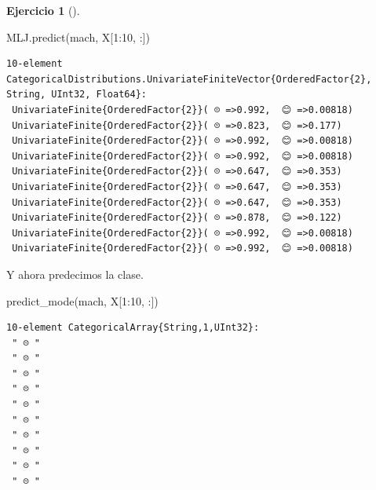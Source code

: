 \documentclass[
  a4paper,
]{scrreport}
\newenvironment{Shaded}{\begin{snugshade}}{\end{snugshade}}
\newcommand{\FloatTok}[1]{\textcolor[rgb]{0.68,0.00,0.00}{#1}}
\newcommand{\FunctionTok}[1]{\textcolor[rgb]{0.28,0.35,0.67}{#1}}
\newcommand{\NormalTok}[1]{\textcolor[rgb]{0.00,0.23,0.31}{#1}}
\newcommand{\OperatorTok}[1]{\textcolor[rgb]{0.37,0.37,0.37}{#1}}
\theoremstyle{definition}
\newtheorem{exercise}{Ejercicio}[chapter]
\theoremstyle{remark}
\begin{document}
\begin{exercise}[]
\begin{enumerate}
\begin{tcolorbox}
\begin{Shaded}
\begin{Highlighting}[]
\NormalTok{MLJ.}\FunctionTok{predict}\NormalTok{(mach, X[}\FloatTok{1}\OperatorTok{:}\FloatTok{10}\NormalTok{, }\OperatorTok{:}\NormalTok{])}
\end{Highlighting}
\end{Shaded}

\begin{verbatim}
10-element CategoricalDistributions.UnivariateFiniteVector{OrderedFactor{2}, String, UInt32, Float64}:
 UnivariateFinite{OrderedFactor{2}}( ☹️ =>0.992,  😊 =>0.00818)
 UnivariateFinite{OrderedFactor{2}}( ☹️ =>0.823,  😊 =>0.177)
 UnivariateFinite{OrderedFactor{2}}( ☹️ =>0.992,  😊 =>0.00818)
 UnivariateFinite{OrderedFactor{2}}( ☹️ =>0.992,  😊 =>0.00818)
 UnivariateFinite{OrderedFactor{2}}( ☹️ =>0.647,  😊 =>0.353)
 UnivariateFinite{OrderedFactor{2}}( ☹️ =>0.647,  😊 =>0.353)
 UnivariateFinite{OrderedFactor{2}}( ☹️ =>0.647,  😊 =>0.353)
 UnivariateFinite{OrderedFactor{2}}( ☹️ =>0.878,  😊 =>0.122)
 UnivariateFinite{OrderedFactor{2}}( ☹️ =>0.992,  😊 =>0.00818)
 UnivariateFinite{OrderedFactor{2}}( ☹️ =>0.992,  😊 =>0.00818)
\end{verbatim}

  Y ahora predecimos la clase.

\begin{Shaded}
\begin{Highlighting}[]
\FunctionTok{predict\_mode}\NormalTok{(mach, X[}\FloatTok{1}\OperatorTok{:}\FloatTok{10}\NormalTok{, }\OperatorTok{:}\NormalTok{])}
\end{Highlighting}
\end{Shaded}

\begin{verbatim}
10-element CategoricalArray{String,1,UInt32}:
 " ☹️ "
 " ☹️ "
 " ☹️ "
 " ☹️ "
 " ☹️ "
 " ☹️ "
 " ☹️ "
 " ☹️ "
 " ☹️ "
 " ☹️ "
\end{verbatim}

  \end{tcolorbox}
\end{enumerate}

\end{exercise}
\end{document}
